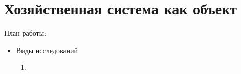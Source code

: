 \section{Хозяйственная система как объект}

План работы:
\begin{itemize}
    \item Виды исследований
    \begin{enumerate}
        \item 
    \end{enumerate}
\end{itemize}